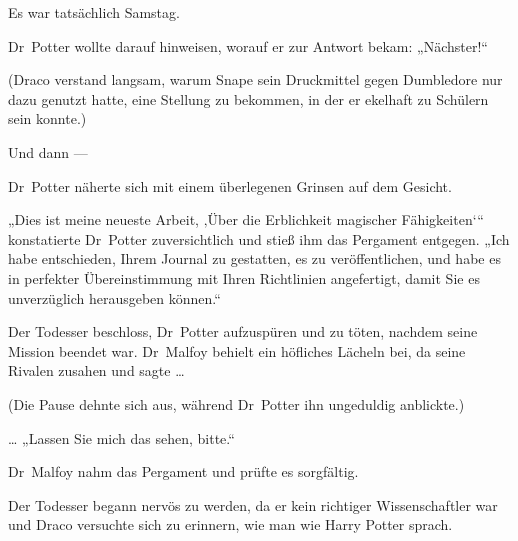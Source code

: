 Es war tatsächlich Samstag.

Dr~Potter wollte darauf hinweisen, worauf er zur Antwort bekam:
„Nächster!“

(Draco verstand langsam, warum Snape sein Druckmittel gegen Dumbledore nur dazu genutzt hatte, eine Stellung zu bekommen, in der er ekelhaft zu Schülern sein konnte.)

Und dann —

Dr~Potter näherte sich mit einem überlegenen Grinsen auf dem Gesicht.

„Dies ist meine neueste Arbeit, ‚Über die Erblichkeit magischer Fähigkeiten‘“ konstatierte Dr~Potter zuversichtlich und stieß ihm das Pergament entgegen.
„Ich habe entschieden, Ihrem Journal zu gestatten, es zu veröffentlichen, und habe es in perfekter Übereinstimmung mit Ihren Richtlinien angefertigt, damit Sie es unverzüglich herausgeben können.“

Der Todesser beschloss, Dr~Potter aufzuspüren und zu töten, nachdem seine Mission beendet war. Dr~Malfoy behielt ein höfliches Lächeln bei, da seine Rivalen zusahen und sagte …

(Die Pause dehnte sich aus, während Dr~Potter ihn ungeduldig anblickte.)

…
„Lassen Sie mich das sehen, bitte.“

Dr~Malfoy nahm das Pergament und prüfte es sorgfältig.

Der Todesser begann nervös zu werden, da er kein richtiger Wissenschaftler war und Draco versuchte sich zu erinnern, wie man wie Harry Potter sprach.

